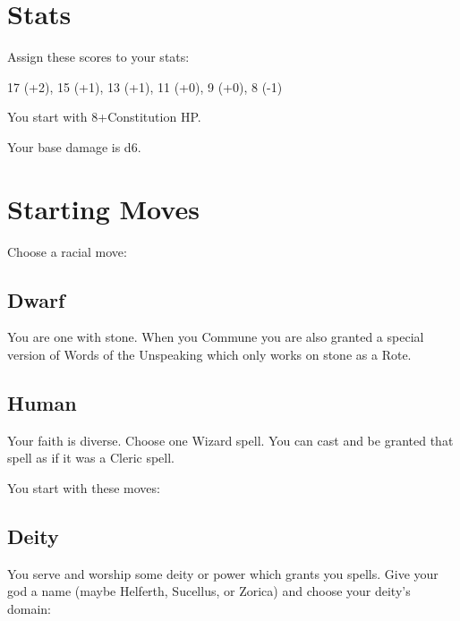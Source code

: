  
\section{Stats}   
 



Assign these scores to your stats:

 

17 (+2), 15 (+1), 13 (+1), 11 (+0), 9 (+0), 8 (-1)

 

You start with 8+Constitution HP.



 

Your base damage is d6.

 
\section{Starting Moves}   
 


\startInstructionsAfterHeader
Choose a racial move:
\stopInstructionsAfterHeader
 


\subsection{Dwarf}   
 

You are one with stone. When you Commune you are also granted a special version of Words of the Unspeaking which only works on stone as a Rote.

 
\subsection{Human}   
 

Your faith is diverse. Choose one Wizard spell. You can cast and be granted that spell as if it was a Cleric spell.



 


\startInstructions
You start with these moves:
\stopInstructions
 


\subsection{Deity}   
 

You serve and worship some deity or power which grants you spells. Give your god a name (maybe Helferth, Sucellus, or Zorica) and choose your deity’s domain:

